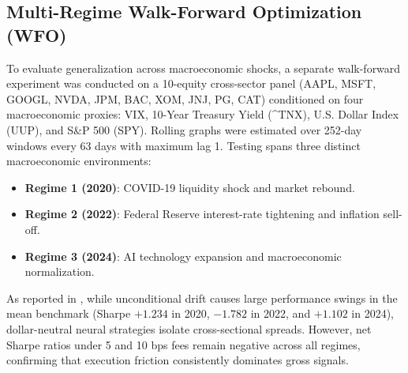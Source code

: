 \documentclass[10pt,twocolumn,a4paper]{article}
\begin{document}
\subsection{Multi-Regime Walk-Forward Optimization (WFO)}
To evaluate generalization across macroeconomic shocks, a separate walk-forward experiment was conducted on a 10-equity cross-sector panel (AAPL, MSFT, GOOGL, NVDA, JPM, BAC, XOM, JNJ, PG, CAT) conditioned on four macroeconomic proxies: VIX, 10-Year Treasury Yield (\textasciicircum TNX), U.S. Dollar Index (UUP), and S\&P 500 (SPY). Rolling graphs were estimated over 252-day windows every 63 days with maximum lag 1. Testing spans three distinct macroeconomic environments:
\begin{itemize}
    \item \textbf{Regime 1 (2020)}: COVID-19 liquidity shock and market rebound.
    \item \textbf{Regime 2 (2022)}: Federal Reserve interest-rate tightening and inflation sell-off.
    \item \textbf{Regime 3 (2024)}: AI technology expansion and macroeconomic normalization.
\end{itemize}

\begin{table}[t]
\caption{Exploratory regime-specific walk-forward evaluation on the 10-equity panel (unweighted means across 2020, 2022, and 2024 test periods).}
\label{tab:wfo_summary}
\vskip 0.05in
\centering
{}
\end{table}

As reported in , while unconditional drift causes large performance swings in the mean benchmark (Sharpe $+1.234$ in 2020, $-1.782$ in 2022, and $+1.102$ in 2024), dollar-neutral neural strategies isolate cross-sectional spreads. However, net Sharpe ratios under 5 and 10 bps fees remain negative across all regimes, confirming that execution friction consistently dominates gross signals.
\end{document}
